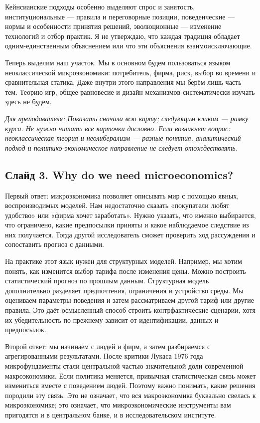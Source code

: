 \documentclass[11pt,a4paper]{article}
\newcommand{\slide}[2]{\subsection*{\textcolor{NESblue}{Слайд #1.} #2}\pdfbookmark[2]{Слайд #1. #2}{script-#1}\hypertarget{script-#1}{}}
\newcommand{\cue}[1]{{\small\color{NESgray}\textit{Для преподавателя: #1}\par}}
\begin{document}
Кейнсианские подходы особенно выделяют спрос и занятость, институциональные --- правила и переговорные позиции, поведенческие --- нормы и особенности принятия решений, эволюционные --- изменение технологий и отбор практик. Я не утверждаю, что каждая традиция обладает одним-единственным объяснением или что эти объяснения взаимоисключающие.

Теперь выделим наш участок. Мы в основном будем пользоваться языком неоклассической микроэкономики: потребитель, фирма, риск, выбор во времени и сравнительная статика. Даже внутри этого направления мы берём лишь часть тем. Теорию игр, общее равновесие и дизайн механизмов систематически изучать здесь не будем.

\cue{Показать сначала всю карту; следующим кликом --- рамку курса. Не нужно читать все карточки дословно. Если возникнет вопрос: неоклассическая теория и неолиберализм --- разные понятия, аналитический подход и политико-экономическое направление не следует отождествлять.}

\slide{3}{Why do we need microeconomics?}
Первый ответ: микроэкономика позволяет описывать мир с помощью явных, воспроизводимых моделей. Нам недостаточно сказать «покупатели любят удобство» или «фирма хочет заработать». Нужно указать, что именно выбирается, что ограничено, какие предпосылки приняты и какое наблюдаемое следствие из них получается. Тогда другой исследователь сможет проверить ход рассуждения и сопоставить прогноз с данными.

На практике этот язык нужен для структурных моделей. Например, мы хотим понять, как изменится выбор тарифа после изменения цены. Можно построить статистический прогноз по прошлым данным. Структурная модель дополнительно разделяет предпочтения, ограничения и устройство среды. Мы оцениваем параметры поведения и затем рассматриваем другой тариф или другие правила. Это даёт осмысленный способ строить контрфактические сценарии, хотя их убедительность по-прежнему зависит от идентификации, данных и предпосылок.

Второй ответ: мы начинаем с людей и фирм, а затем разбираемся с агрегированными результатами. После критики Лукаса 1976 года микрофундаменты стали центральной частью значительной доли современной макроэкономики. Если политика меняется, привычная статистическая связь может измениться вместе с поведением людей. Поэтому важно понимать, какие решения породили эту связь. Это не означает, что вся макроэкономика буквально свелась к микроэкономике; это означает, что микроэкономические инструменты вам пригодятся и в центральном банке, и в исследовательском институте.
\end{document}
